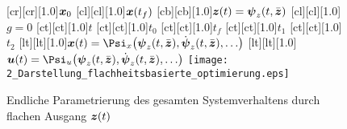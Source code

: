 \begin{figure}[ht]
\centering
  [cr][cr][1.0]{$\boldsymbol{x}_0$}
	[cl][cl][1.0]{$\boldsymbol{x}(t_f)$}
	[cb][cb][1.0]{$\boldsymbol{z}(t) = \boldsymbol{\psi}_z(t,\bar{\boldsymbol{z}})$}
	[cl][cl][1.0]{$g=0$}
	[ct][ct][1.0]{$t$}
	[ct][ct][1.0]{$t_0$}
	[ct][ct][1.0]{$t_f$}
	[ct][ct][1.0]{$t_1$}
	[ct][ct][1.0]{$t_2$}
	[lt][lt][1.0]{$\bs{x}(t) = \bs{\Psi}_x\!\left( \bs{\psi}_z(t,\bar{\bs{z}}), \dot{\bs{\psi}}_z(t,\bar{\bs{z}}), \ldots\right)$}
	[lt][lt][1.0]{$\bs{u}(t) = \bs{\Psi}_u\!\left( \bs{\psi}_z(t,\bar{\bs{z}}), \dot{\bs{\psi}}_z(t,\bar{\bs{z}}), \ldots\right)$}
 \texttt{[image: 2\_Darstellung\_flachheitsbasierte\_optimierung.eps]}
	\caption[Endliche Parametrierung durch flachen Ausgang]{Endliche Parametrierung des gesamten Systemverhaltens durch flachen Ausgang $\boldsymbol{z}(t)$} 
	\label{fig:flachheitsbasierte_optimierung}
\end{figure}







